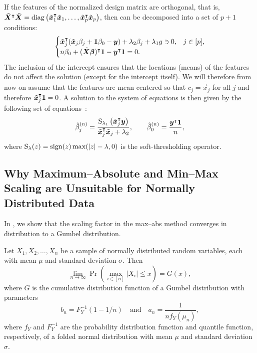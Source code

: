 If the features of the normalized design matrix are orthogonal, that is,
\(\tilde{\boldsymbol{X}}^\intercal \tilde{\boldsymbol{X}} = \operatorname{diag}\left(\tilde{\boldsymbol{x}}_1^\intercal
\tilde{\boldsymbol{x}}_1, \dots, \tilde{\boldsymbol{x}}_p^\intercal \tilde{\boldsymbol{x}}_p\right) \), then
 can be decomposed into a set of \(p + 1\) conditions:
%
\[
  \begin{cases}
    \tilde{\boldsymbol{x}}_j^\intercal (\tilde{\boldsymbol{x}}_j \beta_j + \boldsymbol{1} \beta_0 - \boldsymbol{y}) + \lambda_2 \beta_j + \lambda_1 g \ni 0, & j \in [p], \\
    n \beta_0 + (\tilde{\boldsymbol{X}}\boldsymbol{\beta})^\intercal \boldsymbol{1} -  \boldsymbol{y}^\intercal \boldsymbol{1} = 0.
  \end{cases}
\]
%
The inclusion of the intercept ensures that the locations (means) of the features do not
affect the solution (except for the intercept itself). We will therefore from now on assume
that the features are mean-centered so that \(c_j = \bar{\vec{x}}_j\) for all \(j\) and
therefore \(\tilde{\boldsymbol{x}}_j^\intercal \boldsymbol{1} = 0\). A solution to the system of equations is then
given by the following set of equations~\citep{donoho1994}:
%
\begin{equation*}
  \hat{\beta}^{(n)}_j = \frac{\operatorname{S}_{\lambda_1}\left(\tilde{\boldsymbol{x}}_j^\intercal \boldsymbol{y}\right)}{\tilde{\boldsymbol{x}}_j^\intercal \tilde{\boldsymbol{x}}_j + \lambda_2},
  \qquad
  \hat{\beta}_0^{(n)} = \frac{\boldsymbol{y}^\intercal \boldsymbol{1}}{n},
\end{equation*}
%
where \(\operatorname{S}_\lambda(z) = \operatorname{sign}(z) \max(|z| - \lambda, 0)\) is the soft-thresholding
operator.

\subsection{Why Maximum--Absolute and Min--Max Scaling are Unsuitable for Normally Distributed Data}%
\label{sec:maxabs-theory}

In , we show that the scaling factor in the max--abs method converges
in distribution to a Gumbel distribution.

\begin{theorem}
  \label{thm:maxabs-gev}
  Let \(X_1, X_2, \dots, X_n\) be a sample of normally distributed random variables, each with mean \(\mu\) and standard deviation \(\sigma\). Then
  \[
    \lim_{n \rightarrow \infty}\Pr\left(\max_{i \in [n]} |X_i| \leq x\right) = G(x),
  \]
  where \(G\) is the cumulative distribution function of a Gumbel distribution with
  parameters
  \[
    b_n = F_Y^{-1}(1 - 1/n)\quad \text{and} \quad a_n = \frac{1}{n f_Y(\mu_n)},
  \]
  where \(f_Y\) and \(F_Y^{-1}\) are the probability distribution function and quantile
  function, respectively, of a folded normal distribution with mean \(\mu\) and standard
  deviation \(\sigma\).
\end{theorem}

